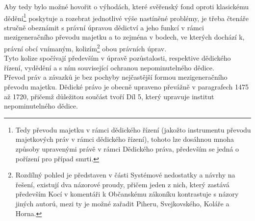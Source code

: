 \documentclass{article}
\begin{document}

\newpage

Aby tedy bylo možné hovořit o výhodách, které svěřenský fond oproti klasickému dědění\footnote{Tedy převodu majetku v rámci dědického řízení (jakožto instrumentu převodu majetkových práv v rámci dědického řízení), tohoto lze dosáhnou mnoha způsoby upravenými právě v rámci Dědického práva, především se jedná o pořízení pro případ smrti.} poskytuje a rozebrat jednotlivé výše nastíněné problémy, je třeba čtenáře stručně obeznámit s právní úpravou dědictví a jeho funkcí v rámci mezigeneračního převodu majetku a to zejména v bodech, ve kterých dochází k, právní obcí vnímaným, kolizím\footnote{Rozdílný pohled je představen v části Systémové nedostatky a návrhy na řešení, existují dva názorové proudy, přičem jeden z nich, který zastává především Kocí v komentáři k Občanskému zákoníku kontrastuje s názory jiných autorú, mezi ty je možné zařadit Piheru, Svejkovského, Koláře a Horna.} obou právních úprav.\\


Tyto kolize spočívají především v úpravě pozůstalosti, respektive dědického řízení, vydědění a s ním související ochranou nepominutelného dědice.\\

Převod práv a závazků je bez pochyby nejčastější formou mezigeneračního převodu majetku. Dědické právo je obecně upraveno převážně v paragrafech 1475 až 1720, přičemž důležitou součást tvoří Díl 5, který upravuje institut nepominutelného dědice.\\

\end{document}
